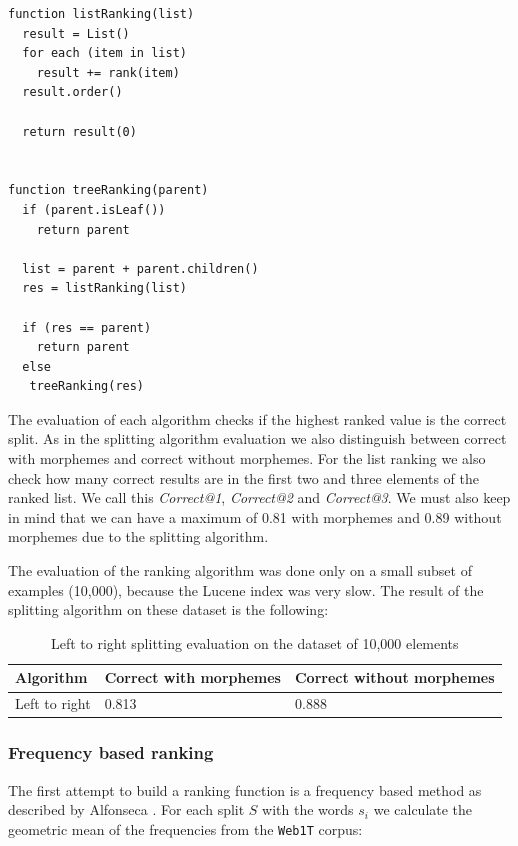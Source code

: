 \documentclass[11pt, accentcolor=tud9b, nochapname]{tudreport}
\begin{document}
\begin{lstlisting}
function listRanking(list)
  result = List()
  for each (item in list)
    result += rank(item)
  result.order()

  return result(0)


function treeRanking(parent)
  if (parent.isLeaf())
    return parent

  list = parent + parent.children()
  res = listRanking(list)

  if (res == parent)
    return parent
  else
   treeRanking(res)
\end{lstlisting}

The evaluation of each algorithm checks if the highest ranked value is the correct split. As in the splitting algorithm evaluation we also distinguish between correct with morphemes and correct without morphemes. For the list ranking we also check how many correct results are in the first two and three elements of the ranked list. We call this \emph{Correct@1}, \emph{Correct@2} and \emph{Correct@3}. We must also keep in mind that we can have a maximum of 0.81 with morphemes and 0.89 without morphemes due to the splitting algorithm.

The evaluation of the ranking algorithm was done only on a small subset of examples (10,000), because the Lucene index was very slow. The result of the splitting algorithm on these dataset is the following:

\begin{table}[h]
\begin{center}
\begin{tabular}{l | l | l}
  \hline
  \textbf{Algorithm}  & \textbf{Correct with morphemes} & \textbf{Correct without morphemes} \\ \hline
  Left to right & 0.813 & 0.888 \\ \hline
\end{tabular}
\end{center}
\caption{Left to right splitting evaluation on the dataset of 10,000 elements}
\end{table}

\subsubsection{Frequency based ranking}
The first attempt to build a ranking function is a frequency based method as described by Alfonseca \cite{alf2008}. For each split $S$ with the words $s_i$ we calculate the geometric mean of the frequencies from the \texttt{Web1T} corpus:
\end{document}
